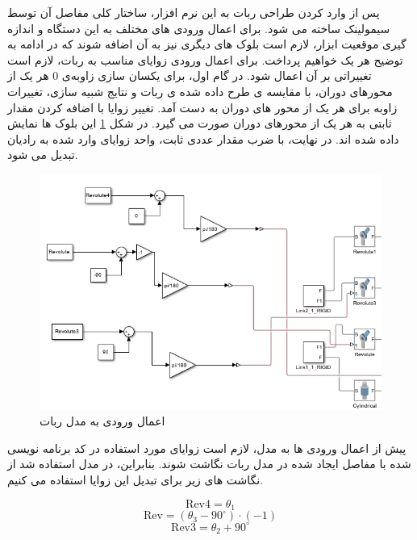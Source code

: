 \documentclass{article}
\begin{document}
پس از وارد کردن طراحی ربات به این نرم افزار، ساختار کلی مفاصل آن توسط سیمولینک ساخته می شود. 
برای اعمال ورودی های مختلف به این دستگاه و اندازه گیری موقعیت ابزار، لازم است بلوک های دیگری نیز به آن اضافه شوند که در ادامه به توضیح هر یک خواهیم پرداخت.
برای اعمال ورودی زوایای مناسب به ربات، لازم است تغییراتی بر آن اعمال شود. در گام اول، برای یکسان سازی زاوبه‌ی 0 هر یک از محورهای دوران، با مقایسه ی طرح داده شده ی ربات و نتایج شبیه سازی، تغییرات زاوبه برای هر یک از محور های دوران به دست آمد. تغییر زوایا با اضافه کردن مقدار ثابتی به هر یک از محورهای دوران صورت می گیرد. 
در شکل \ref{fig:Robot_Input} این بلوک ها نمایش داده شده اند.
در نهایت، با ضرب مقدار عددی ثابت، واحد زوایای وارد شده به رادیان تبدیل می شود.

\begin{figure}[h]
    \centering
    \includegraphics[width=0.5\linewidth]{inputs.PNG}
    \caption{اعمال ورودی به مدل ربات}
    \label{fig:Robot_Input}
\end{figure}

پیش از اعمال ورودی ها به مدل، لازم است زوایای مورد استفاده در کد برنامه نویسی شده با مفاصل ایجاد شده در مدل ربات نگاشت شوند. بنابراین، در مدل استفاده شد از نگاشت های زیر برای تبدیل این زوایا استفاده می کنیم.

\[
\text{Rev4} = \theta_1
\]
\[
\text{Rev} = (\theta_3 - 90^\circ) \cdot (-1)
\]
\[
\text{Rev3} = \theta_2 + 90^\circ
\]
\end{document}
